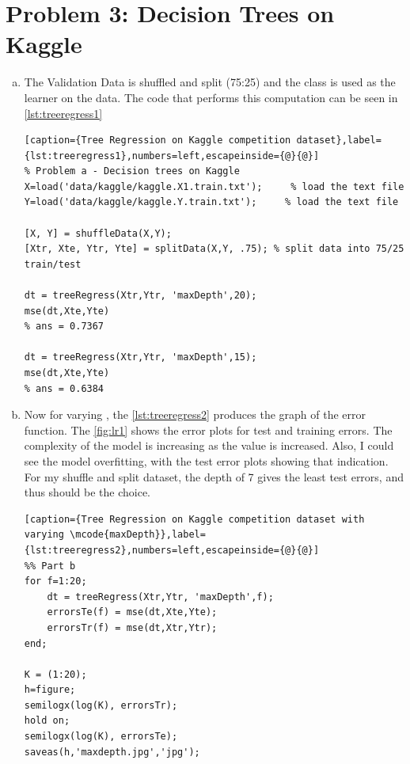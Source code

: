 \documentclass[a4paper, 11pt]{article}
\begin{document}
\pagebreak
\section*{Problem 3: Decision Trees on Kaggle}
\begin{enumerate}[(a)]
\item The Validation Data is shuffled and split (75:25) and the  class is used as the learner on the data. The code that performs this computation can be seen in \autoref{lst:treeregress1}
\vspace{-25pt}
\begin{lstlisting}[caption={Tree Regression on Kaggle competition dataset},label={lst:treeregress1},numbers=left,escapeinside={@}{@}]
% Problem a - Decision trees on Kaggle
X=load('data/kaggle/kaggle.X1.train.txt');     % load the text file
Y=load('data/kaggle/kaggle.Y.train.txt');     % load the text file

[X, Y] = shuffleData(X,Y);
[Xtr, Xte, Ytr, Yte] = splitData(X,Y, .75); % split data into 75/25 train/test

dt = treeRegress(Xtr,Ytr, 'maxDepth',20);
mse(dt,Xte,Yte) 
% ans = 0.7367

dt = treeRegress(Xtr,Ytr, 'maxDepth',15);
mse(dt,Xte,Yte)
% ans = 0.6384
\end{lstlisting}

\item Now for varying , the \autoref{lst:treeregress2} produces the  graph of the error function. The \autoref{fig:lr1} shows the error plots for test and training errors. The complexity of the model is increasing as the  value is increased. Also, I could see the model overfitting, with the test error plots showing that indication. For my shuffle and split dataset, the depth of 7 gives the least test errors, and thus should be the choice.
\vspace{-20pt}
\begin{lstlisting}[caption={Tree Regression on Kaggle competition dataset with varying \mcode{maxDepth}},label={lst:treeregress2},numbers=left,escapeinside={@}{@}]
%% Part b
for f=1:20;
    dt = treeRegress(Xtr,Ytr, 'maxDepth',f);
    errorsTe(f) = mse(dt,Xte,Yte);
    errorsTr(f) = mse(dt,Xtr,Ytr);
end;

K = (1:20);
h=figure;
semilogx(log(K), errorsTr);
hold on;
semilogx(log(K), errorsTe);
saveas(h,'maxdepth.jpg','jpg');
\end{lstlisting}


\end{enumerate}
\end{document}
